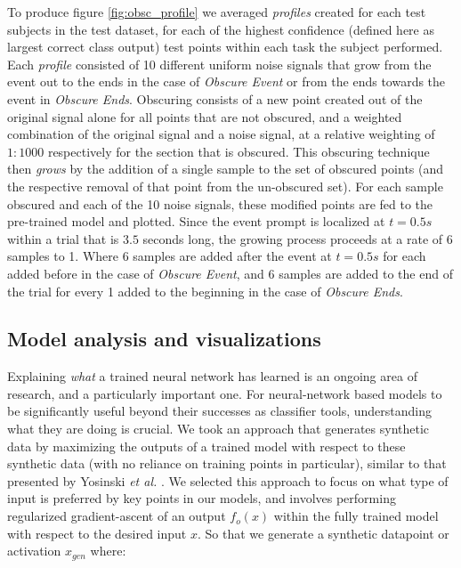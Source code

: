 \documentclass[fleqn,10pt]{wlscirep}
\begin{document}
To produce figure \ref{fig:obsc_profile} we averaged {\em profiles} created for each test subjects in the test dataset, for each of the highest confidence (defined here as largest correct class output) test points within each task the subject performed. Each {\em profile} consisted of 10 different uniform noise signals that grow from the event out to the ends in the case of {\em Obscure Event} or from the ends towards the event in {\em Obscure Ends}. Obscuring consists of a new point created out of the original signal alone for all points that are not obscured, and a weighted combination of the original signal and a noise signal, at a relative weighting of $1:1000$ respectively for the section that is obscured. This obscuring technique then {\em grows} by the addition of a single sample to the set of obscured points (and the respective removal of that point from the un-obscured set). For each sample obscured and each of the 10 noise signals, these modified points are fed to the pre-trained model and plotted. Since the event prompt is localized at $t=0.5s$ within a trial that is $3.5$ seconds long, the growing process proceeds at a rate of 6 samples to 1. Where 6 samples are added after the event at $t=0.5s$ for each added before in the case of {\em Obscure Event}, and 6 samples are added to the end of the trial for every 1 added to the beginning in the case of {\em Obscure Ends}.

\subsection*{Model analysis and visualizations} \label{sec:max_act}

Explaining {\em what} a trained neural network has learned is an ongoing area of research, and a particularly important one. For neural-network based models to be significantly useful beyond their successes as classifier tools, understanding what they are doing is crucial. We took an approach that generates synthetic data by maximizing the outputs of a trained model with respect to these synthetic data (with no reliance on training points in particular), similar to that presented by Yosinski {\em et al.} \cite{Yosinski2015}. We selected this approach to focus on what type of input is preferred by key points in our models, and involves performing regularized gradient-ascent of an output $f_o(x)$ within the fully trained model with respect to the desired input $x$. So that we generate a synthetic datapoint or activation $x_{gen}$ where:
\end{document}
